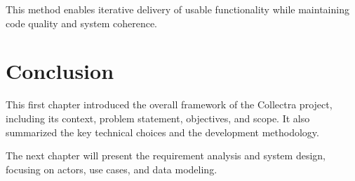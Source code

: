 \documentclass[12pt,a4paper]{report}
\begin{document}
This method enables iterative delivery of usable functionality while maintaining code quality and system coherence.

\section*{Conclusion}
This first chapter introduced the overall framework of the Collectra project, including its context, problem statement, objectives, and scope. It also summarized the key technical choices and the development methodology.

The next chapter will present the requirement analysis and system design, focusing on actors, use cases, and data modeling.
\end{document}
